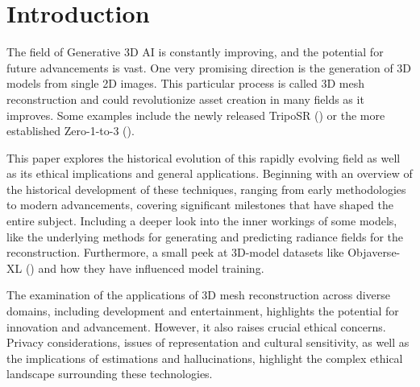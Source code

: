 

\section{Introduction}
\label{section:Introduction}

The field of Generative 3D AI is constantly improving, and the potential for future advancements is vast. One very promising direction is the generation of 3D models from single 2D images. This particular process is called 3D mesh reconstruction and could revolutionize asset creation in many fields as it improves.
Some examples include the newly released TripoSR (\textcite{tochilkin_triposr_2024}) or the more established Zero-1-to-3 (\textcite{liu_zero-1--3_2023}).

This paper explores the historical evolution of this rapidly evolving field as well as its ethical implications and general applications.
Beginning with an overview of the historical development of these techniques, ranging from early methodologies to modern advancements, covering significant milestones that have shaped the entire subject.
Including a deeper look into the inner workings of some models, like the underlying methods for generating and predicting radiance fields for the reconstruction. Furthermore, a small peek at 3D-model datasets like Objaverse-XL (\textcite{deitke_objaverse-xl_2023}) and how they have influenced model training.

The examination of the applications of 3D mesh reconstruction across diverse domains, including development and entertainment, highlights the potential for innovation and advancement. However, it also raises crucial ethical concerns. Privacy considerations, issues of representation and cultural sensitivity, as well as the implications of estimations and hallucinations, highlight the complex ethical landscape surrounding these technologies.



